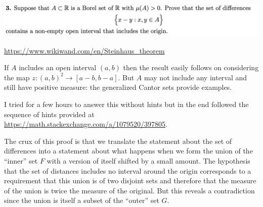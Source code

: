 \newpage
\begin{mdframed}
\includegraphics[width=400pt]{img/analysis--berkeley-202a-hw05-ad8b.png}
\end{mdframed}

\url{https://www.wikiwand.com/en/Steinhaus_theorem}

\begin{remark*}
  If $A$ includes an open interval $(a, b)$ then the result easily follows on considering the
  map $z:(a, b)^2\to [a-b, b-a]$. But $A$ may not include any interval and still have positive measure: the
  generalized Cantor sets provide examples.
\end{remark*}

\begin{remark*}
  I tried for a few hours to answer this without hints but in the end followed the sequence of hints provided
  at \url{https://math.stackexchange.com/a/1079520/397805}.
\end{remark*}


\begin{intuition*}
  The crux of this proof is that we translate the statement about the set of differences into a statement about
  what happens when we form the union of the ``inner​'' set $F$ with a version of itself shifted by a small
  amount. The hypothesis that the set of distances includes no interval around the origin corresponds to a
  requirement that this union is of two disjoint sets and therefore that the measure of the union is twice the
  measure of the original. But this reveals a contradiction since the union is itself a subset of the ``outer​''
  set $G$.
\end{intuition*}

